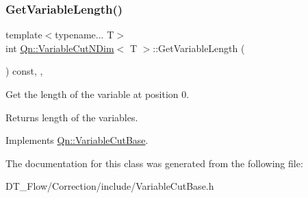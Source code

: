 \subsubsection{\texorpdfstring{Get\+Variable\+Length()}{GetVariableLength()}}
{\footnotesize\ttfamily template$<$typename... T$>$ \\
int \mbox{\hyperlink{classQn_1_1VariableCutNDim}{Qn\+::\+Variable\+Cut\+N\+Dim}}$<$ T $>$\+::Get\+Variable\+Length (\begin{DoxyParamCaption}{ }\end{DoxyParamCaption}) const\hspace{0.3cm}{\ttfamily [inline]}, {\ttfamily [override]}, {\ttfamily [virtual]}}

Get the length of the variable at position 0. \begin{DoxyReturn}{Returns}
length of the variables. 
\end{DoxyReturn}


Implements \mbox{\hyperlink{structQn_1_1VariableCutBase}{Qn\+::\+Variable\+Cut\+Base}}.



The documentation for this class was generated from the following file\+:\begin{DoxyCompactItemize}
\item 
D\+T\+\_\+\+Flow/\+Correction/include/Variable\+Cut\+Base.\+h\end{DoxyCompactItemize}
